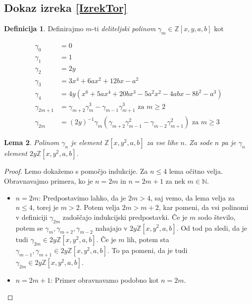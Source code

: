 \documentclass[12pt,a4paper,twoside]{article}
\theoremstyle{definition} %
\newtheorem{definicija}{Definicija}[section]
\theoremstyle{plain} %
\newtheorem{lema}[definicija]{Lema}
\numberwithin{equation}{section}  %
\newcommand{\N}{\mathbb N}
\newcommand{\Z}{\mathbb Z}
\begin{document}
\subsection{Dokaz izreka \ref{IzrekTor}}
\begin{definicija}
Definirajmo $m$-ti \emph{deliteljski polinom} $\gamma_m \in \Z[x,y,a,b]$ kot


\begin{align}
\gamma_0 &{}= 0  \nonumber \\
\gamma_1 &{}= 1  \nonumber \\
\gamma_2 &{}= 2y  \nonumber \\
\gamma_3 &{}= 3x^4 + 6ax^2 + 12bx-a^2 \nonumber \\
\gamma_4 &{}= 4y(x^6+5ax^4+20bx^3-5a^2x^2-4abx-8b^2-a^3) \nonumber \\
\gamma_{2m+1} &{}= \gamma_{m+2}\gamma_{m}^3-\gamma_{m-1}\gamma_{m+1}^3 \text{ za } m \geq 2 \nonumber \\
\gamma_{2m} &{}= (2y)^{-1}\gamma_{m}(\gamma_{m+2}\gamma_{m-1}^2-\gamma_{m-2}\gamma_{m+1}^2)\text{ za } m \geq 3 \nonumber
\end{align}

\end{definicija}

\begin{lema}
Polinom $\gamma_{n}$ je element $\Z[x,y^2,a,b]$ za vse lihe $n$.  Za sode $n$ pa je $\gamma_{n}$ element \newline $2y\Z[x,y^2,a,b]$.

\end{lema}

\begin{proof}
Lemo dokažemo s pomočjo indukcije. Za $n \leq 4$ lema očitno velja. Obravnavajmo primera, ko je $n=2m$ in  $n=2m+1$ za nek $m\in\N$.
\begin{itemize}
\item{$n=2m$:}
Predpostavimo lahko, da je $2m>4$, saj vemo, da lema velja za $n\leq 4$, torej je $m>2$. Potem velja $2m>m+2$, kar pomeni, da vsi polinomi v definiciji $\gamma_{2m}$ zadoščajo indukcijski predpostavki. Če je $m$ sodo število, potem se $\gamma_{m},\gamma_{m+2},\gamma_{m-2}$ nahajajo v $2y\Z[x,y^2,a,b]$. Od tod pa sledi, da je tudi $\gamma_{2m} \in 2y\Z[x,y^2,a,b]$.
Če je $m$ lih, potem sta $\gamma_{m-1},\gamma_{m+1} \in 2y\Z[x,y^2,a,b]$. To pa pomeni, da je tudi  $\gamma_{2m} \in 2y\Z[x,y^2,a,b]$.
\item{$n=2m+1$:}
Primer obravnavamo podobno kot $n=2m$.


\end{itemize}


\end{proof}
\end{document}
